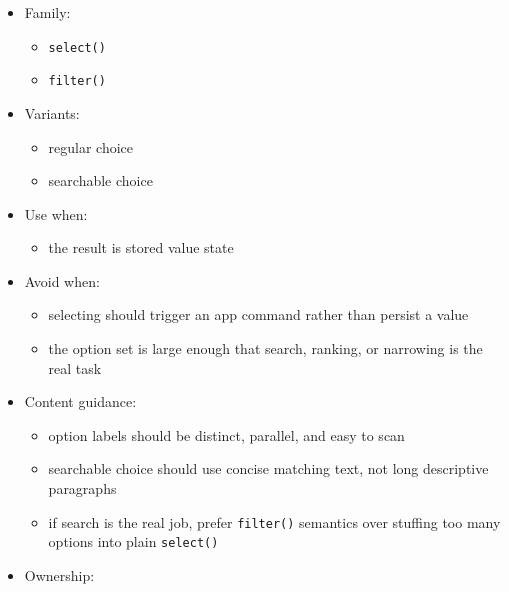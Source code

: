 \begin{itemize}
\tightlist
\item
  Family:

  \begin{itemize}
  \tightlist
  \item
    \texttt{s\allowbreak{}e\allowbreak{}l\allowbreak{}e\allowbreak{}c\allowbreak{}t\allowbreak{}(\allowbreak{})}
  \item
    \texttt{f\allowbreak{}i\allowbreak{}l\allowbreak{}t\allowbreak{}e\allowbreak{}r\allowbreak{}(\allowbreak{})}
  \end{itemize}
\item
  Variants:

  \begin{itemize}
  \tightlist
  \item
    regular choice
  \item
    searchable choice
  \end{itemize}
\item
  Use when:

  \begin{itemize}
  \tightlist
  \item
    the result is stored value state
  \end{itemize}
\item
  Avoid when:

  \begin{itemize}
  \tightlist
  \item
    selecting should trigger an app command rather than persist a value
  \item
    the option set is large enough that search, ranking, or narrowing is the real task
  \end{itemize}
\item
  Content guidance:

  \begin{itemize}
  \tightlist
  \item
    option labels should be distinct, parallel, and easy to scan
  \item
    searchable choice should use concise matching text, not long descriptive paragraphs
  \item
    if search is the real job, prefer \texttt{f\allowbreak{}i\allowbreak{}l\allowbreak{}t\allowbreak{}e\allowbreak{}r\allowbreak{}(\allowbreak{})} semantics over stuffing too many options into plain \texttt{s\allowbreak{}e\allowbreak{}l\allowbreak{}e\allowbreak{}c\allowbreak{}t\allowbreak{}(\allowbreak{})}
  \end{itemize}
\item
  Ownership:


\end{itemize}
